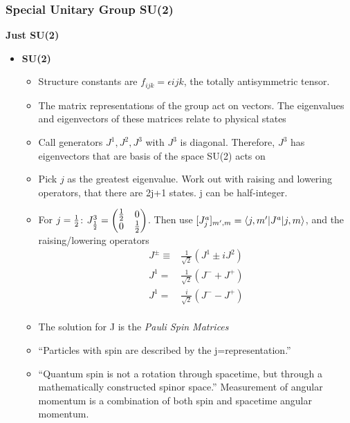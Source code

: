\subsubsection{Special Unitary Group SU(2)}
{\color{red}\textbf{Just SU(2)}}
\begin{itemize}
    \item \textbf{SU(2)} \cite{robinson}
    \begin{itemize}
        \item Structure constants are $f_{ijk}=\epsilon{ijk}$, the totally antisymmetric tensor.  \cite{robinson}
        \item The matrix representations of the group act on vectors. The eigenvalues and eigenvectors of these matrices relate to physical states \cite{robinson}
        \item Call generators $J^1,J^2,J^3$ with $J^3$ is diagonal. Therefore, $J^3$ has eigenvectors that are basis of the space SU(2) acts on \cite{robinson}
        \item Pick $j$ as the greatest eigenvalue. Work out with raising and lowering operators, that there are 2j+1 states. j can be half-integer. \cite{robinson}
        \item For $j=\frac{1}{2}$: $J^3_\frac{1}{2}=\begin{pmatrix}\frac{1}{2}&0\\0&\frac{1}{2}\end{pmatrix}$. Then use $[J^a_j]_{m',m}=\braket{j,m'|J^a|j,m}$, and the raising/lowering operators \cite{robinson}
        \begin{equation}\begin{split}
        J^\pm\equiv&\frac{1}{\sqrt{2}}(J^1\pm iJ^2) \\
        J^1=&\frac{1}{\sqrt{2}}(J^-+J^+) \\
        J^1=&\frac{i}{\sqrt{2}}(J^--J^+) \\
        \end{split}\end{equation}
        \item The solution for J is the \emph{Pauli Spin Matrices} \cite{robinson}
        \item ``Particles with spin \half are described by the j=\half representation.'' \cite{robinson}
        \item ``Quantum spin is not a rotation through spacetime, but through a mathematically constructed spinor space.'' Measurement of angular momentum is a combination of both spin and spacetime angular momentum. \cite{robinson}

\end{itemize}
\end{itemize}
